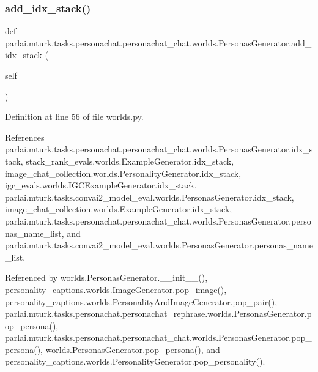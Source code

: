 \subsubsection{\texorpdfstring{add\+\_\+idx\+\_\+stack()}{add\_idx\_stack()}}
{\footnotesize\ttfamily def parlai.\+mturk.\+tasks.\+personachat.\+personachat\+\_\+chat.\+worlds.\+Personas\+Generator.\+add\+\_\+idx\+\_\+stack (\begin{DoxyParamCaption}\item[{}]{self }\end{DoxyParamCaption})}



Definition at line 56 of file worlds.\+py.



References parlai.\+mturk.\+tasks.\+personachat.\+personachat\+\_\+chat.\+worlds.\+Personas\+Generator.\+idx\+\_\+stack, stack\+\_\+rank\+\_\+evals.\+worlds.\+Example\+Generator.\+idx\+\_\+stack, image\+\_\+chat\+\_\+collection.\+worlds.\+Personality\+Generator.\+idx\+\_\+stack, igc\+\_\+evals.\+worlds.\+I\+G\+C\+Example\+Generator.\+idx\+\_\+stack, parlai.\+mturk.\+tasks.\+convai2\+\_\+model\+\_\+eval.\+worlds.\+Personas\+Generator.\+idx\+\_\+stack, image\+\_\+chat\+\_\+collection.\+worlds.\+Example\+Generator.\+idx\+\_\+stack, parlai.\+mturk.\+tasks.\+personachat.\+personachat\+\_\+chat.\+worlds.\+Personas\+Generator.\+personas\+\_\+name\+\_\+list, and parlai.\+mturk.\+tasks.\+convai2\+\_\+model\+\_\+eval.\+worlds.\+Personas\+Generator.\+personas\+\_\+name\+\_\+list.



Referenced by worlds.\+Personas\+Generator.\+\_\+\+\_\+init\+\_\+\+\_\+(), personality\+\_\+captions.\+worlds.\+Image\+Generator.\+pop\+\_\+image(), personality\+\_\+captions.\+worlds.\+Personality\+And\+Image\+Generator.\+pop\+\_\+pair(), parlai.\+mturk.\+tasks.\+personachat.\+personachat\+\_\+rephrase.\+worlds.\+Personas\+Generator.\+pop\+\_\+persona(), parlai.\+mturk.\+tasks.\+personachat.\+personachat\+\_\+chat.\+worlds.\+Personas\+Generator.\+pop\+\_\+persona(), worlds.\+Personas\+Generator.\+pop\+\_\+persona(), and personality\+\_\+captions.\+worlds.\+Personality\+Generator.\+pop\+\_\+personality().

